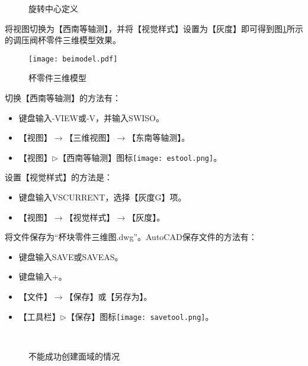 \begin{procedure}
\begin{figure}[htbp]
\centering
{}\hspace{30pt}
\caption{旋转中心定义}
\end{figure}
\item 将视图切换为【西南等轴测】，并将【视觉样式】设置为【灰度】即可得到图\ref{fig:beimodel}所示的调压阀杯零件三维模型效果。
\begin{figure}
\centering
\texttt{[image: beimodel.pdf]}
\caption{杯零件三维模型}\label{fig:beimodel}
\end{figure}
切换【西南等轴测】的方法有：
\begin{itemize}
\item 键盘输入-VIEW或-V，并输入SWISO。
\item 【视图】$\rightarrow$【三维视图】$\rightarrow$【东南等轴测】。
\item 【视图】$\triangleright$【西南等轴测】图标\texttt{[image: estool.png]}。
\end{itemize}
设置【视觉样式】的方法是：
\begin{itemize}
\item  键盘输入VSCURRENT，选择【灰度G】项。
\item 【视图】$\rightarrow$【视觉样式】$\rightarrow$【灰度】。
\end{itemize}
\item 将文件保存为“杯块零件三维图.dwg”。AutoCAD保存文件的方法有：
\begin{itemize}
\item 键盘输入SAVE或SAVEAS。
\item 键盘输入+。
\item 【文件】$\rightarrow$【保存】或【另存为】。
\item 【工具栏】$\triangleright$【保存】图标\texttt{[image: savetool.png]}。
\end{itemize}
\end{procedure}
\begin{figure}[htbp]
\centering
{}\hspace{20pt}
\\
\hspace{20pt}
\caption{不能成功创建面域的情况}\label{fig:buchengong}
\end{figure}

